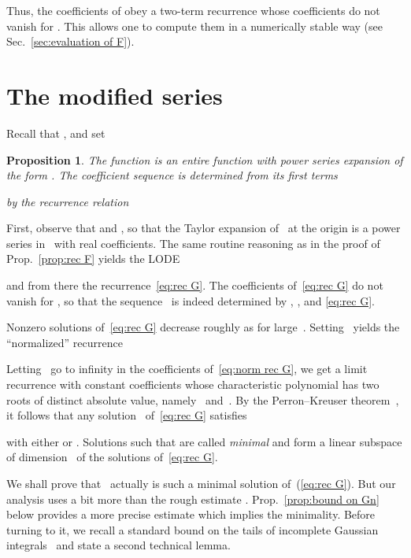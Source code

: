 \documentclass[10pt, conference]{IEEEtran}
\newtheorem{proposition}{Proposition}
\begin{document}
Thus, the coefficients of  obey a two-term recurrence
whose coefficients do not vanish for . This allows one to
compute them in a numerically stable way (see Sec.~\ref{sec:evaluation of F}).




\section{The modified series }
\label{sec:G}

Recall that , and set


\begin{proposition}
  \label{prop:rec G}
  The function  is an entire function with power series
  expansion of the form .
  The coefficient sequence  is
  determined from its first terms
  
  by the recurrence relation
  
\end{proposition}

\begin{IEEEproof}
  First, observe that  and , so that the Taylor
  expansion of~ at the origin is a power series in~ with
  real coefficients. The same routine reasoning as in the proof of
  Prop.~\ref{prop:rec F} yields the LODE
  
  and from there the recurrence~\eqref{eq:rec G}. The coefficients
  of~\eqref{eq:rec G} do not vanish for , so that the
  sequence~ is indeed determined by , , and \eqref{eq:rec G}.
\end{IEEEproof}

Nonzero solutions of~\eqref{eq:rec G} decrease roughly as  for
large~.
Setting~ yields the
``normalized'' recurrence

Letting ~go to infinity in the coefficients of~\eqref{eq:norm rec G}, we
get a limit recurrence with constant coefficients whose
characteristic polynomial  has two roots of
distinct absolute value, namely ~and~. By the Perron--Kreuser
theorem~{\cite[Theorem~B.10]{Wimp1984}}, it follows that any solution~ of~\eqref{eq:rec G} satisfies

with either  or . Solutions  such that  are called
{\emph{minimal}} and form a linear subspace of dimension~ of the solutions of~\eqref{eq:rec G}.

We shall prove that~ actually is such a minimal solution of~(\ref{eq:rec
G}). But our analysis uses a bit more than the rough estimate . Prop.~\ref{prop:bound on Gn} below
provides a more precise estimate which implies the minimality.
Before turning to it, we recall a standard bound on the tails of incomplete Gaussian integrals~{\cite[Eq.~7.12.1]{DLMF}} and state a second technical lemma.
\end{document}
